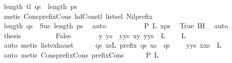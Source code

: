 \begin{isabellebody}
\ {\isachardoublequoteopen}length\ {\isacharparenleft}tl\ qs{\isacharparenright}\ {\isasymle}\ length\ ps{\isachardoublequoteclose}\isanewline
\ \ \ \ \ \ \ \ \isamarkupfalse%
\ {\isacharparenleft}metis\ Cons{\isacharunderscore}prefix{\isacharunderscore}Cons\ hd{\isacharunderscore}Cons{\isacharunderscore}tl\ list{\isachardot}sel{\isacharparenleft}{}{\isacharparenright}\ Nil{\isacharunderscore}prefix{\isacharparenright}\ \isanewline
\ \ \ \ \ \ \isamarkupfalse%
\ {\isachardoublequoteopen}length\ qs\ {\isasymle}\ Suc\ {\isacharparenleft}length\ ps{\isacharparenright}{\isachardoublequoteclose}\ \isamarkupfalse%
\ auto\isanewline
\ \ \ \ \isacommand{{\isacharbraceright}}\isamarkupfalse%
\isanewline
\ \ \ \ \isamarkupfalse%
\ {\isachardoublequoteopen}{\isacharquery}P\ L\ {\isacharparenleft}x{\isacharhash}ps{\isacharparenright}{\isachardoublequoteclose}\ \isamarkupfalse%
\ True\ IH\ \isamarkupfalse%
\ auto\isanewline
\ \ \ \ \isamarkupfalse%
\ {\isacharquery}thesis\ \isacommand{{\isachardot}{\isachardot}}\isamarkupfalse%
\isanewline
\ \ \isamarkupfalse%
\isanewline
\ \ \ \ \isamarkupfalse%
\ False\isanewline
\ \ \ \ \isamarkupfalse%
\ \isamarkupfalse%
\ y\ ys\ \ yys{\isacharcolon}\ {\isachardoublequoteopen}x{\isasymnoteq}y{\isachardoublequoteclose}\ {\isachardoublequoteopen}y{\isacharhash}ys\ {\isasymin}\ L{\isachardoublequoteclose}\ \isamarkupfalse%
\ {\isacartoucheopen}{\isacharbrackleft}{\isacharbrackright}\ {\isasymnotin}\ L{\isacartoucheclose}\isanewline
\ \ \ \ \ \ \isamarkupfalse%
\ {\isacharparenleft}auto{\isacharparenright}\ {\isacharparenleft}metis\ list{\isachardot}exhaust{\isacharparenright}\isanewline
\ \ \ \ \isamarkupfalse%
\ {\isachardoublequoteopen}{\isasymforall}qs{\isachardot}\ {\isacharparenleft}{\isasymforall}xs{\isasymin}L{\isachardot}\ prefix\ qs\ xs{\isacharparenright}\ {\isasymlongrightarrow}\ qs\ {\isacharequal}\ {\isacharbrackleft}{\isacharbrackright}{\isachardoublequoteclose}\ \isamarkupfalse%
\ yys\ {\isacartoucheopen}x{\isacharhash}xs\ {\isasymin}\ L{\isacartoucheclose}\isanewline
\ \ \ \ \ \ \isamarkupfalse%
\ auto\ {\isacharparenleft}metis\ Cons{\isacharunderscore}prefix{\isacharunderscore}Cons\ prefix{\isacharunderscore}Cons{\isacharparenright}\isanewline
\ \ \ \ \isamarkupfalse%
\ {\isachardoublequoteopen}{\isacharquery}P\ L\ {\isacharbrackleft}{\isacharbrackright}{\isachardoublequoteclose}\ \isamarkupfalse%

\end{isabellebody}
